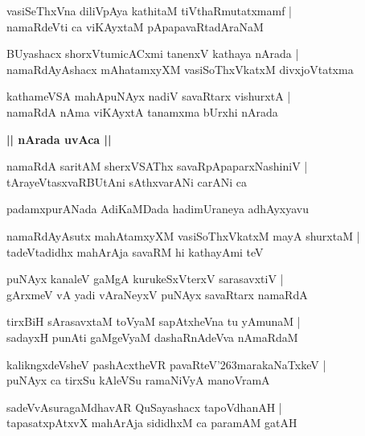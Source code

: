 \documentclass[twoside,12pt,openright]{book}
\def\S{\char'263}
\newcounter{shloka}[chapter]
\def\uvaca#1{\centerline{{\large\textbf{#1}}}}
\begin{document}
\begin{shloka}
vasiSeThxVna diliVpAya kathitaM tiVthaRmutatxmamf |\\
namaRdeVti ca viKAyxtaM pApapavaRtadAraNaM
\end{shloka}

\begin{shloka}
BUyashacx shorxVtumicACxmi tanenxV kathaya nArada |\\
namaRdAyAshacx mAhatamxyXM vasiSoThxVkatxM divxjoVtatxma
\end{shloka}

\begin{shloka}
kathameVSA mahApuNAyx nadiV savaRtarx vishurxtA |\\
namaRdA nAma viKAyxtA tanamxma bUrxhi nArada
\end{shloka}

\uvaca{|| nArada uvAca ||}

\begin{shloka}
namaRdA saritAM sherxVSAThx savaRpApaparxNashiniV |\\
tArayeVtasxvaRBUtAni sAthxvarANi carANi ca 
\end{shloka}

\begin{center}
padamxpurANada AdiKaMDada hadimUraneya adhAyxyavu
\end{center}

\begin{shloka}
namaRdAyAsutx mahAtamxyXM  vasiSoThxVkatxM mayA shurxtaM |\\
tadeVtadidhx mahArAja savaRM hi kathayAmi teV 
\end{shloka}

\begin{shloka}
puNAyx kanaleV gaMgA kurukeSxVterxV sarasavxtiV |\\
gArxmeV vA yadi vAraNeyxV puNAyx savaRtarx namaRdA
\end{shloka}

\begin{shloka}
tirxBiH sArasavxtaM toVyaM sapAtxheVna tu yAmunaM |\\
sadayxH punAti gaMgeVyaM dashaRnAdeVva nAmaRdaM 
\end{shloka}

\begin{shloka}
kalikngxdeVsheV pashAcxtheVR pavaRteV\S marakaNaTxkeV |\\
puNAyx ca tirxSu kAleVSu ramaNiVyA manoVramA
\end{shloka}

\begin{shloka}
sadeVvAsuragaMdhavAR QuSayashacx tapoVdhanAH |\\
tapasatxpAtxvX mahArAja sididhxM ca paramAM gatAH
\end{shloka}
\end{document}
